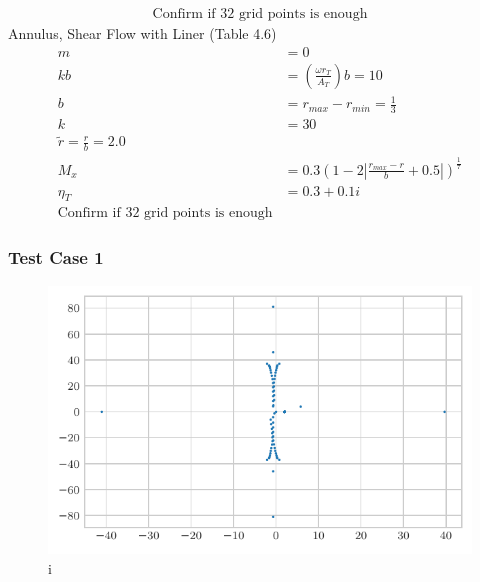 \documentclass[12pt]{uthesis-v12}  %
\begin{document}
\begin{itemize}
\begin{align*}
            \text{Confirm if 32 grid points is enough}
        \end{align*}
        \subitem Annulus, Shear Flow with Liner (Table 4.6)
        \begin{align*}
            m &= 0 \\
            kb &= \left(\frac{\omega r_T}{A_T}\right)b = 10 \\
            b &= r_{max} - r_{min}  = \frac{1}{3}\\
            k &= 30 \\
            \tilde{r} = \frac{r}{b} = 2.0 \\
            M_x &= 0.3\left(1 - 2 \left| \frac{r_{max}-r}{b} + 0.5 \right|  \right)^{\frac{1}{7}} \\
            \eta_T &= 0.3 + 0.1i\\
            \text{Confirm if 32 grid points is enough}
        \end{align*}
\end{itemize}
\subsubsection{Test Case 1}
\begin{figure}[h!]
    \centering
    \includegraphics[width=\textwidth]{Chapter-5-Results/tex-outputs/gam.acc.scatter.pdf}
    \caption{i}
\end{figure}
\begin{tiny}
 \begin{figure}
     \centering
     
 \end{figure}
\end{tiny}
\end{document}
